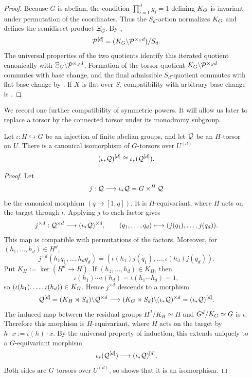 \begin{proof}
Because $G$ is abelian, the condition $\prod_{i=1}^d g_i=1$ defining
$K_{G}$ is invariant under permutation of the coordinates. Thus the
$S_d$-action normalizes $K_{G}$ and defines the semidirect product $\Xi_G$.
By ,
\[
\mathcal{P}^{[d]}=(K_{G}\backslash\mathcal{P}^{\times_S d})/S_d.
\]
The universal properties of the two quotients identify this iterated
quotient canonically with $\Xi_G\backslash\mathcal{P}^{\times_S d}$. Formation of
the torsor quotient $K_{G}\backslash\mathcal{P}^{\times_S d}$ commutes with base
change, and the final admissible $S_d$-quotient commutes with flat base
change by \cite[V.1.9]{sga1}. If $X$ is flat over $S$, compatibility with
arbitrary base change is \cite[Proposition~2.33]{Guignard2018}.
\end{proof}

We record one further compatibility of symmetric powers. It will allow us
later to replace a torsor by the connected torsor under its monodromy
subgroup.

\begin{lemma}
\label{lemma:symmetric_power_induced_torsor}
Let $\iota:H\hookrightarrow G$ be an injection of finite abelian groups, and
let $\mathcal{Q}$ be an $H$-torsor on $U$. There is a canonical isomorphism of
$G$-torsors over $U^{(d)}$
\[
    (\iota_*\mathcal{Q})^{[d]}\cong\iota_*(\mathcal{Q}^{[d]}).
\]
\end{lemma}

\begin{proof}
Let
\[
    j:\mathcal{Q}\longrightarrow\iota_*\mathcal{Q}=G\times^H\mathcal{Q}
\]
be the canonical morphism $(q\mapsto[1,q])$. It is $H$-equivariant, where
$H$ acts on the target through $\iota$. Applying $j$ to each factor gives
\[
    j^{\times d}:\mathcal{Q}^{\times d}\longrightarrow(\iota_*\mathcal{Q})^{\times d},
    \qquad
    (q_1,\dots,q_d)\longmapsto(j(q_1),\dots,j(q_d)).
\]
This map is compatible with permutations of the factors. Moreover, for
$(h_1,\dots,h_d)\in H^d$,
\[
    j^{\times d}(h_1q_1,\dots,h_dq_d)
      =(\iota(h_1)j(q_1),\dots,\iota(h_d)j(q_d)).
\]
Put $K_H:=\ker(H^d\to H)$. If $(h_1,\dots,h_d)\in K_H$, then
\[
    \iota(h_1)\cdots\iota(h_d)
      =\iota(h_1\cdots h_d)=1,
\]
so $(\iota(h_1),\dots,\iota(h_d))\in K_{G}$. Hence $j^{\times d}$ descends to
a morphism
\[
    \mathcal{Q}^{[d]}=(K_H\rtimes S_d)\backslash\mathcal{Q}^{\times d}
       \longrightarrow
    (K_{G}\rtimes S_d)\backslash(\iota_*\mathcal{Q})^{\times d}
       =(\iota_*\mathcal{Q})^{[d]}.
\]
The induced map between the residual groups
$H^d/K_H\simeq H$ and $G^d/K_{G}\simeq G$ is $\iota$. Therefore this morphism
is $H$-equivariant, where $H$ acts on the target by
$h\cdot x:=\iota(h)\cdot x$.
By the universal property of induction, this extends uniquely to a
$G$-equivariant morphism
\[
    \iota_*(\mathcal{Q}^{[d]})\longrightarrow(\iota_*\mathcal{Q})^{[d]}.
\]
Both sides are $G$-torsors over $U^{(d)}$, so
 shows that it is an isomorphism.
\end{proof}




